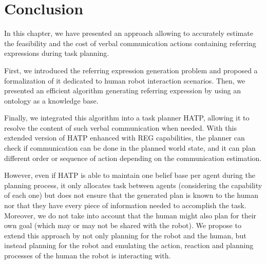 \documentclass[a4paper,11pt,twoside]{StyleThese}
\begin{document}

\section{Conclusion}
In this chapter, we have presented an approach allowing to accurately estimate the feasibility and the cost of verbal communication actions containing referring expressions during task planning.

First, we introduced the referring expression generation problem and proposed a formalization of it dedicated to human robot interaction scenarios. Then, we presented an efficient algorithm generating referring expression by using an ontology as a knowledge base.

Finally, we integrated this algorithm into a task planner HATP, allowing it to resolve the content of such verbal communication when needed. With this extended version of HATP enhanced with REG capabilities, the planner can check if communication can be done in the planned world state, and it can plan different order or sequence of action depending on the communication estimation.

However, even if HATP is able to maintain one belief base per agent during the planning process, it only allocates task between agents (considering the capability of each one) but does not ensure that the generated plan is known to the human nor that they have every piece of information needed to accomplish the task. Moreover, we do not take into account that the human might also plan for their own goal (which may or may not be shared with the robot). 
We propose to extend this approach by not only planning for the robot and the human, but instead planning for the robot and emulating the action, reaction and planning processes of the human the robot is interacting with.

\ifdefined{}
\else


\end{document}
